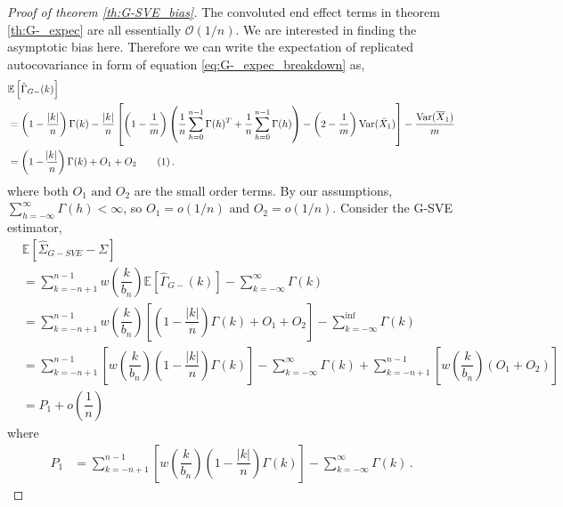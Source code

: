 \documentclass[11pt]{article}
\newcommand{\Var}{\text{Var}}
\newcommand\numberthis{\addtocounter{equation}{1}\tag{\theequation}}
\theoremstyle{remark}
\begin{document}
\begin{proof}[Proof of theorem \ref{th:G-SVE_bias}]
The convoluted end effect terms in theorem \ref{th:G-_expec} are all essentially $\mathcal{O}(1/n)$. We are interested in finding the asymptotic bias here. Therefore we can write the expectation of replicated autocovariance in form of equation \ref{eq:G-_expec_breakdown} as,
\begin{align*}
&\mathbb{E} \left[\hat{\Gamma}_{G-}(k) \right]\\
&  = \left(1- \dfrac{|k|}{n}\right)\Gamma(k) - \dfrac{|k|}{n}\left[\left(1-\dfrac{1}{m}\right)\left(\dfrac{1}{n}\sum_{h=0}^{n-1}\Gamma(h)^T + \dfrac{1}{n}\sum_{h=0}^{n-1}\Gamma(h)\right) - \left(2-\dfrac{1}{m}\right) \Var(\bar{X}_1)\right] - \dfrac{\Var(\overline{X}_1)}{m} \\
& = \left(1 - \dfrac{\abs{k}}{n}\right)\Gamma(k) + O_1 + O_2  \numberthis \label{eq:G-_bias2}  \,.
\end{align*}
%
%
where both $O_1 \textrm{ and } O_2$ are the small order terms. By our assumptions, $\sum_{h=-\infty}^{\infty}\Gamma(h) < \infty$, so $O_1 = o(1/n) \text{ and } O_2 = o(1/n)$.  Consider the G-SVE estimator,
\begin{align*}
    &\mathbb{E} \left[\hat{\Sigma}_{G-SVE} - \Sigma \right]\\
    &= \sum_{k=-n+1}^{n-1} w\left(\dfrac{k}{b_n}\right)\mathbb{E} \left[\hat{\Gamma}_{G-}(k) \right] - \sum_{k=-\infty}^{\infty}\Gamma(k)\\
    &= \sum_{k=-n+1}^{n-1}  w\left(\dfrac{k}{b_n}\right)\left[\left(1-\dfrac{|k|}{n}\right)\Gamma(k) +O_1 + O_2\right]  - \sum_{k=-\infty}^{\inf}\Gamma(k)\\
    &= \sum_{k=-n+1}^{n-1} \left[ w\left(\dfrac{k}{b_n}\right)\left(1-\dfrac{|k|}{n}\right)\Gamma(k)\right]  - \sum_{k=-\infty}^{\infty}\Gamma(k) + \sum_{k=-n+1}^{n-1}\left[  w\left(\dfrac{k}{b_n}\right)\left(O_1 + O_2\right)\right] \\ 
    & = P_1 + o \left( \dfrac{1}{n} \right)\,
\end{align*}
%
where 
\begin{align*}
P_1 & = \sum\limits_{k=-n+1}^{n-1}\left[w\left(\dfrac{k}{b_n}\right)\left(1-\dfrac{|k|}{n}\right)\Gamma(k) \right] - \sum\limits_{k=-\infty}^{\infty}\Gamma(k)\,.

\end{align*}
\end{proof}
\end{document}
